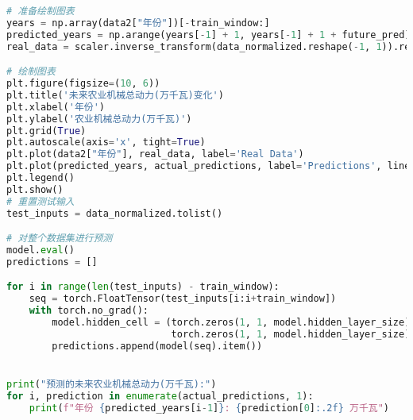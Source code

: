 \begin{lstlisting}[language=python,caption={中国机械总量}]
# 准备绘制图表
years = np.array(data2["年份"])[-train_window:]
predicted_years = np.arange(years[-1] + 1, years[-1] + 1 + future_pred)
real_data = scaler.inverse_transform(data_normalized.reshape(-1, 1)).reshape(-1)

# 绘制图表
plt.figure(figsize=(10, 6))
plt.title('未来农业机械总动力(万千瓦)变化')
plt.xlabel('年份')
plt.ylabel('农业机械总动力(万千瓦)')
plt.grid(True)
plt.autoscale(axis='x', tight=True)
plt.plot(data2["年份"], real_data, label='Real Data')
plt.plot(predicted_years, actual_predictions, label='Predictions', linestyle='--')
plt.legend()
plt.show()
# 重置测试输入
test_inputs = data_normalized.tolist()

# 对整个数据集进行预测
model.eval()
predictions = []

for i in range(len(test_inputs) - train_window):
    seq = torch.FloatTensor(test_inputs[i:i+train_window])
    with torch.no_grad():
        model.hidden_cell = (torch.zeros(1, 1, model.hidden_layer_size),
                             torch.zeros(1, 1, model.hidden_layer_size))
        predictions.append(model(seq).item())


print("预测的未来农业机械总动力(万千瓦):")
for i, prediction in enumerate(actual_predictions, 1):
    print(f"年份 {predicted_years[i-1]}: {prediction[0]:.2f} 万千瓦")

\end{lstlisting}
